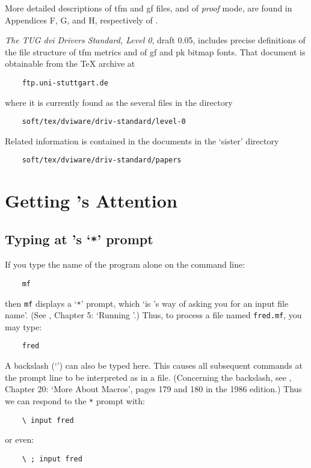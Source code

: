 More detailed descriptions of {\sc tfm} and {\sc gf} files, and of
{\em proof\/} mode, are found in Appendices F, G, and H, respectively
of \MFbook{}.

{\sl The TUG {\sc dvi} Drivers Standard, Level 0}, draft 0.05, includes
precise definitions of the file structure of {\sc tfm} metrics and of
{\sc gf} and {\sc pk} bitmap fonts.
That document is obtainable from the \TeX{} archive at
\begin{verbatim}
    ftp.uni-stuttgart.de
\end{verbatim}
where it is currently found as the several files in the directory
\begin{verbatim}
    soft/tex/dviware/driv-standard/level-0
\end{verbatim}
Related information is contained in the documents in the `sister'
directory
\begin{verbatim}
    soft/tex/dviware/driv-standard/papers
\end{verbatim}


\section{Getting \MF{}'s Attention}\label{sec:typing}


\subsection{Typing at \MF{}'s `{\tt **}' prompt}\label{sub:starstar}

If you type the name of the \MF{} program alone on the command line:
\begin{verbatim}
    mf
\end{verbatim}
then {\tt mf} displays a `{\tt **}' prompt,
which
`is \MF{}'s way of asking you for an input file name'.
(See \MFbook{}, Chapter 5: `Running \MF{}'.)
Thus, to process a \MF{} file named {\tt fred.mf}, you may type:
\begin{verbatim}
    fred
\end{verbatim}

A backslash (`\ttbsl') can also be typed here.
This causes all subsequent commands at the prompt line to be
interpreted as in a \MF{} file.
(Concerning the backslash, see \MFbook{}, Chapter 20:
`More About Macros', pages 179 and 180 in the 1986 edition.)
Thus we can respond to the {\tt **} prompt with:
\begin{verbatim}
    \ input fred
\end{verbatim}
or even:
\begin{verbatim}
    \ ; input fred
\end{verbatim}

